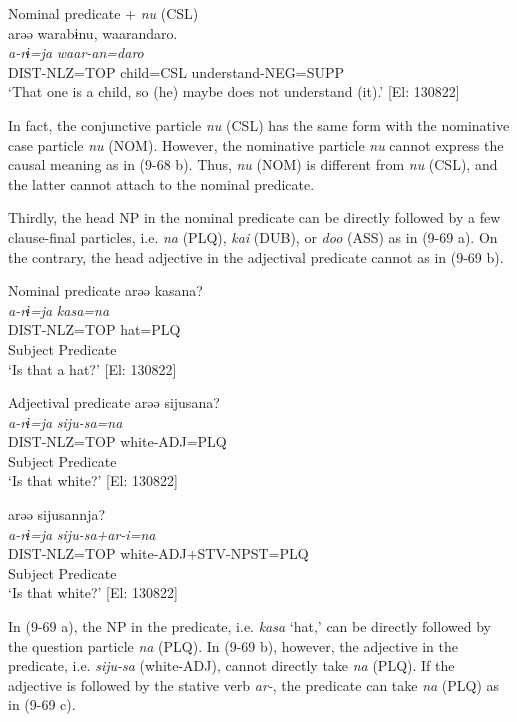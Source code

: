\ex Nominal predicate + \textit{nu} (CSL)\\
 \glll  *arəə  warabɨnu,  waarandaro.\\
    \textit{a-rɨ=ja}  \textit{}  \textit{waar-an=daro}\\
    DIST-NLZ=TOP  child=CSL  understand-NEG=SUPP\\
     ‘That one is a child, so (he) maybe does not understand (it).’ [El: 130822]
    \z
\z

In fact, the conjunctive particle \textit{nu} (CSL) has the same form with the nominative case particle \textit{nu} (NOM). However, the nominative particle \textit{nu} cannot express the causal meaning as in (9-68 b). Thus, \textit{nu} (NOM) is different from \textit{nu} (CSL), and the latter cannot attach to the nominal predicate.

Thirdly, the head NP in the nominal predicate can be directly followed by a few clause-final particles, i.e. \textit{na} (PLQ), \textit{kai} (DUB), or \textit{doo} (ASS) as in (9-69 a). On the contrary, the head adjective in the adjectival predicate cannot as in (9-69 b).

\ea \label{ex:9.69}
\exi{} Nominal predicate 
\ea %
 \gllll  arəə  kasana?\\
      \textit{a-rɨ=ja}  \textit{kasa=na}\\
      DIST-NLZ=TOP  hat=PLQ\\
      Subject  Predicate\\
      \glt       ‘Is that a hat?’ [El: 130822]

\exi{} Adjectival predicate
\ex \label{ex:9.69b} %
    \gllll  *arəə  sijusana?\\
      \textit{a-rɨ=ja}  \textit{siju-sa=na}\\
      DIST-NLZ=TOP  white-ADJ=PLQ\\
      Subject  Predicate\\
       ‘Is that white?’ [El: 130822]

\ex \label{ex:9.69c} %
    \gllll  arəə  sijusannja?\\
      \textit{a-rɨ=ja}  \textit{siju-sa+ar-i=na}\\
      DIST-NLZ=TOP  white-ADJ+STV-NPST=PLQ\\
      Subject  Predicate\\
      \glt        ‘Is that white?’ [El: 130822]
    \z
\z

In (9-69 a), the NP in the predicate, i.e. \textit{kasa} ‘hat,’ can be directly followed by the question particle \textit{na} (PLQ). In (9-69 b), however, the adjective in the predicate, i.e. \textit{siju-sa} (white-ADJ), cannot directly take \textit{na} (PLQ). If the adjective is followed by the stative verb \textit{ar-}, the predicate can take \textit{na} (PLQ) as in (9-69 c).


